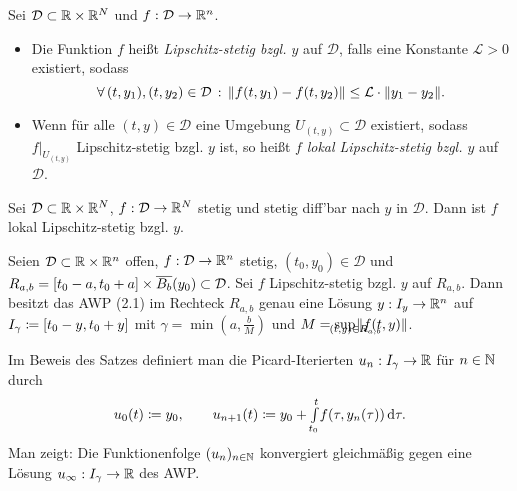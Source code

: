 \documentclass{cheat-sheet}
\newcommand{\D}{\mathcal{D}}
\begin{document}

\begin{defn}
  Sei $\D \subset \R \times \R^N$ und $f : \D \to \R^n$.
  \begin{itemize}
    \item Die Funktion $f $ heißt \emph{Lipschitz-stetig bzgl. $y$} auf $\D$, falls eine Konstante $\mathcal{L} > 0$ existiert, sodass
    \[ \fa{(t, y_1), (t, y_2) \in \D} \norm{f(t, y_1) - f(t, y_2)} \leq \mathcal{L} \cdot \norm{y_1 - y_2}. \]
    \item Wenn für alle $(t, y) \in \D$ eine Umgebung $U_{(t, y)} \subset \D$ existiert, sodass $f|_{U_{(t,y)}}$ Lipschitz-stetig bzgl. $y$ ist, so heißt $f$ \emph{lokal Lipschitz-stetig bzgl. $y$} auf $\D$.
  \end{itemize}
\end{defn}

\begin{lem}
  Sei $\D \subset \R \times \R^N$, $f : \D \to \R^N$ stetig und stetig diff'bar nach $y$ in $\D$. Dann ist $f$ lokal Lipschitz-stetig bzgl. $y$.
\end{lem}


\begin{satz} %
  Seien $\D \subset \R \times \R^n$ offen, $f : \D \to \R^n$ stetig, $(t_0, y_0) \in \D$ und $R_{a,b} = \cinterval{ t_0 - a }{ t_0 + a } \times \overline{B_b}(y_0) \subset \D$. Sei $f$ Lipschitz-stetig bzgl. $y$ auf $R_{a,b}$. Dann besitzt das AWP (2.1) im Rechteck $R_{a,b}$ genau eine Lösung $y : I_y \to \mathbb{R}^n$ auf $I_{\gamma} \coloneqq \left[ t_0 - y, t_0 + y \right]$ mit $\gamma = \min(a, \tfrac{b}{M})$ und $M = \sup_{\mathclap{(t,y) \in R_{a,b}}} \norm{f(t, y)}$.
\end{satz}

\begin{bem}
  Im Beweis des Satzes definiert man die Picard-Iterierten $u_n : I_\gamma \to \mathbb{R}$ für $n \in \mathbb{N}$ durch
  \[
    u_0(t) \coloneqq y_0, \qquad
    u_{n+1}(t) \coloneqq y_0 + {\textstyle \int\limits_{t_0}^{t}} f(\tau, y_n(\tau)) \,\mathrm{d} \tau.
  \]
  Man zeigt: Die Funktionenfolge $(u_n)_{n \in \mathbb{N}}$ konvergiert gleichmäßig gegen eine Lösung $u_\infty : I_\gamma \to \mathbb{R}$ des AWP.
\end{bem}
\end{document}
